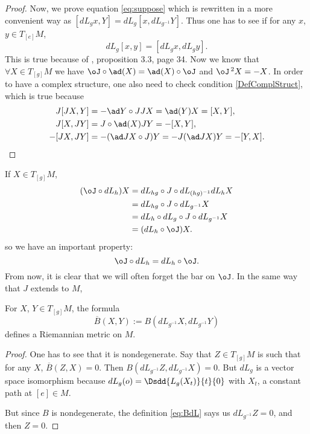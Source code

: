 \begin{proof}
Now, we prove equation \eqref{eq:suppose} which is rewritten in a more convenient way as $[dL_g x,Y]=dL_g[x,dL_{g^{-1}}Y]$. Thus one has to see if for any $x$, $y\in T_{[e]}M$,
\[
   dL_g[x,y]=[dL_g x,dL_g y].
\]
This is true because of \cite{Helgason}, proposition 3.3, page 34.  Now we know that $\forall X\in T_{[g]}M$ we have $\oJ\circ\ad(X)=\ad(X)\circ\oJ$ and ${\oJ}\,^2X=-X$.  In order to have a complex structure, one also need to check condition \eqref{DefComplStruct}, which is true because
\begin{equation}
\begin{split}
J[JX,Y]&=-\ad Y\circ JJX=\ad(Y)X=[X,Y],\\
J[X,JY]&=J\circ\ad(X)JY=-[X,Y],\\
-[JX,JY]&=-(\ad JX\circ J)Y
        =-J(\ad JX)Y
	=-[Y,X].
\end{split}
\end{equation}

\end{proof}

\noindent If $X\in T_{[g]}M$,
\begin{equation}\nonumber
\begin{split}
  (\oJ\circ dL_h)X&=dL_{hg}\circ J\circ dL_{(hg)^{-1}}dL_h X\\
           &=dL_{hg}\circ J\circ dL_{g^{-1}} X\\
	   &=dL_h\circ dL_g\circ J\circ dL_{g^{-1}} X\\
	   &=(dL_h\circ \oJ)X.
\end{split}
\end{equation}
so we have an important property:
\begin{equation}\label{eq:J_dL}
   \oJ\circ dL_h=dL_h\circ\oJ.
\end{equation}
From now, it is clear that we will often forget the bar on $\oJ$.  In the same way that $J$ extends to $M$,

\begin{proposition}
For $X$, $Y\in T_{[g]}M$, the formula
\begin{equation}\label{eq:BdL}
  \overline{ B }(X,Y):=B(dL_{g^{-1}}X,dL_{g^{-1}}Y)
\end{equation}
defines a Riemannian metric on $M$.
\end{proposition}

\begin{proof}
One has to see that it is nondegenerate. Say that $Z\in T_{[g]}M$ is such that for any $X$,
$\overline{ B }(Z,X)=0$. Then $B(dL_{g^{-1}}Z,dL_{g^{-1}}X)=0$. But $dL_g$ is a vector space isomorphism because
$dL_g(o)=\Dsdd{L_g(X_t)}{t}{0}$ with $X_t$, a constant path at $[e]\in M$.

But since $B$ is nondegenerate, the definition \eqref{eq:BdL} says us $dL_{g^{-1}}Z=0$, and then $Z=0$.
\end{proof}

